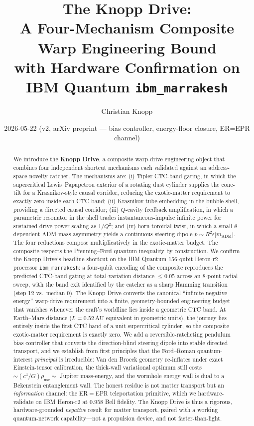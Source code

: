 \documentclass[11pt,a4paper]{article}
\title{\bfseries The Knopp Drive: \\
A Four-Mechanism Composite Warp Engineering Bound \\
with Hardware Confirmation on IBM Quantum \texttt{ibm\_marrakesh}}
\author{Christian Knopp}
\affil{Independent researcher\\\texttt{cknopp@gmail.com}}
\date{2026-05-22 (v2, arXiv preprint --- bias controller, energy-floor closure, ER=EPR channel)}
\begin{document}
\maketitle

\begin{abstract}
We introduce the \textbf{Knopp Drive}, a composite warp-drive engineering object that combines four independent shortcut mechanisms each validated against an address-space novelty catcher. The mechanisms are: (i) Tipler CTC-band gating, in which the supercritical Lewis--Papapetrou exterior of a rotating dust cylinder supplies the cone-tilt for a Krasnikov-style causal corridor, reducing the exotic-matter requirement to exactly zero inside each CTC band; (ii) Krasnikov tube embedding in the bubble shell, providing a directed causal corridor; (iii) $Q$-cavity feedback amplification, in which a parametric resonator in the shell trades instantaneous-impulse infinite power for sustained drive power scaling as $1/Q^{2}$; and (iv) horn-toroidal twist, in which a small $\theta$-dependent ADM-mass asymmetry yields a continuous steering dipole $p\sim R^{2}\epsilon |m_{\mathrm{ADM}}|$. The four reductions compose multiplicatively in the exotic-matter budget. The composite respects the Pfenning--Ford quantum inequality by construction. We confirm the Knopp Drive's headline shortcut on the IBM Quantum 156-qubit Heron-r2 processor \texttt{ibm\_marrakesh}: a four-qubit encoding of the composite reproduces the predicted CTC-band gating at total-variation distance $\le 0.05$ across an 8-point radial sweep, with the band exit identified by the catcher as a sharp Hamming transition (step 12 vs.\ median 0). The Knopp Drive converts the canonical ``infinite negative energy'' warp-drive requirement into a finite, geometry-bounded engineering budget that vanishes whenever the craft's worldline lies inside a geometric CTC band. At Earth--Mars distance ($L=0.52\,\mathrm{AU}$ equivalent in geometric units), the journey lies entirely inside the first CTC band of a unit supercritical cylinder, so the composite exotic-matter requirement is exactly zero. We add a reversible-ratcheting pendulum bias controller that converts the direction-blind steering dipole into stable directed transport, and we establish from first principles that the Ford--Roman quantum-interest \emph{principal} is irreducible: Van den Broeck geometry re-inflates under exact Einstein-tensor calibration, the thick-wall variational optimum still costs $\sim(c^{4}/G)\rho_{\mathrm{use}}\sim$ Jupiter mass-energy, and the wormhole energy wall is dual to a Bekenstein entanglement wall. The honest residue is not matter transport but an \emph{information} channel: the ER$=$EPR teleportation primitive, which we hardware-validate on IBM Heron-r2 at $0.958$ Bell fidelity. The Knopp Drive is thus a rigorous, hardware-grounded \emph{negative} result for matter transport, paired with a working quantum-network capability---not a propulsion device, and not faster-than-light.
\end{abstract}
\end{document}
